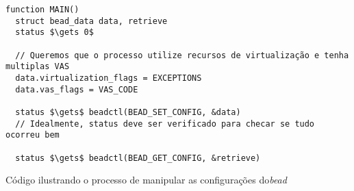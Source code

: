 \begin{pseudocode}

\begin{lstlisting}[language=pseudocode, style=pseudocode]
function MAIN()
  struct bead_data data, retrieve
  status $\gets 0$

  // Queremos que o processo utilize recursos de virtualização e tenha multiplas VAS
  data.virtualization_flags = EXCEPTIONS
  data.vas_flags = VAS_CODE

  status $\gets$ beadctl(BEAD_SET_CONFIG, &data)
  // Idealmente, status deve ser verificado para checar se tudo ocorreu bem

  status $\gets$ beadctl(BEAD_GET_CONFIG, &retrieve)

\end{lstlisting}

  \caption{Código ilustrando o processo de manipular as configurações  do\emph{bead}}
  \label{alg:exconfig}
\end{pseudocode}
